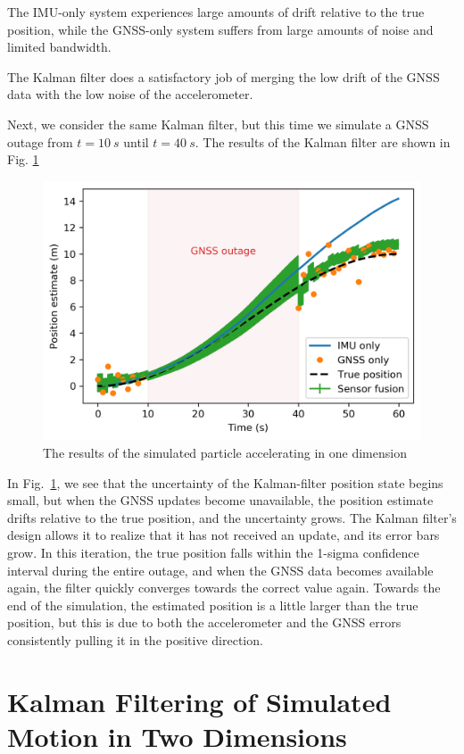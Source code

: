 \documentclass[10pt]{article}
\begin{document}
The IMU-only system experiences large amounts of drift relative to the true position, while the GNSS-only system suffers from large amounts of noise and limited bandwidth. 

The Kalman filter does a satisfactory job of merging the low drift of the GNSS data with the low noise of the accelerometer.

Next, we consider the same Kalman filter, but this time we simulate a GNSS outage from $t=\SI{10}{s}$ until $t=\SI{40}{s}$. The results of the Kalman filter are shown in Fig. \ref{fig:1d-accelerometer-results-wth-outage}

\begin{figure}[hbt]
  \centering
  \includegraphics[width=.5\textwidth]{../images/1d-accelerometer-simulation-with-simulated-outage.png}
  \caption{\label{fig:1d-accelerometer-results-wth-outage} The results of the simulated particle accelerating in one dimension}
\end{figure}

In Fig.~\ref{fig:1d-accelerometer-results-wth-outage}, we see that the uncertainty of the Kalman-filter position state begins small, but when the GNSS updates become unavailable, the position estimate drifts relative to the true position, and the uncertainty grows. The Kalman filter's design allows it to realize that it has not received an update, and its error bars grow. In this iteration, the true position falls within the 1-sigma confidence interval during the entire outage, and when the GNSS data becomes available again, the filter quickly converges towards the correct value again. Towards the end of the simulation, the estimated position is a little larger than the true position, but this is due to both the accelerometer and the GNSS errors consistently pulling it in the positive direction.

\section{Kalman Filtering of Simulated Motion in Two Dimensions}
\end{document}
